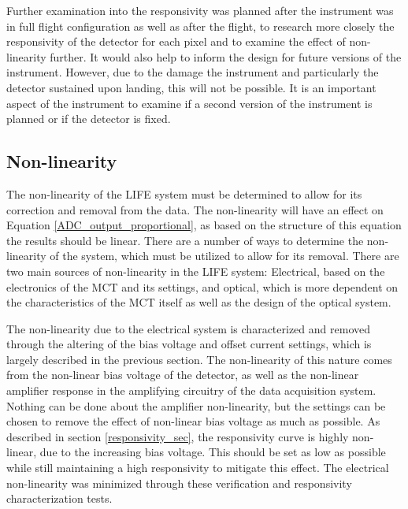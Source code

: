 Further examination into the responsivity was planned after the instrument was in full flight configuration as well as after the flight, to research more closely the responsivity of the detector for each pixel and to examine the effect of non-linearity further. It would also help to inform the design for future versions of the instrument. However, due to the damage the instrument and particularly the detector sustained upon landing, this will not be possible. It is an important aspect of the instrument to examine if a second version of the instrument is planned or if the detector is fixed.

\subsection{Non-linearity}\label{non-linearity_sec}
The non-linearity of the LIFE system must be determined to allow for its correction and removal from the data. The non-linearity will have an effect on Equation \ref{ADC_output_proportional}, as based on the structure of this equation the results should be linear. There are a number of ways to determine the non-linearity of the system, which must be utilized to allow for its removal. There are two main sources of non-linearity in the LIFE system: Electrical, based on the electronics of the MCT and its settings, and optical, which is more dependent on the characteristics of the MCT itself as well as the design of the optical system.

The non-linearity due to the electrical system is characterized and removed through the altering of the bias voltage and offset current settings, which is largely described in the previous section. The non-linearity of this nature comes from the non-linear bias voltage of the detector, as well as the non-linear amplifier response in the amplifying circuitry of the data acquisition system. Nothing can be done about the amplifier non-linearity, but the settings can be chosen to remove the effect of non-linear bias voltage as much as possible. As described in section \ref{responsivity_sec}, the responsivity curve is highly non-linear, due to the increasing bias voltage. This should be set as low as possible while still maintaining a high responsivity to mitigate this effect. The electrical non-linearity was minimized through these verification and responsivity characterization tests.

